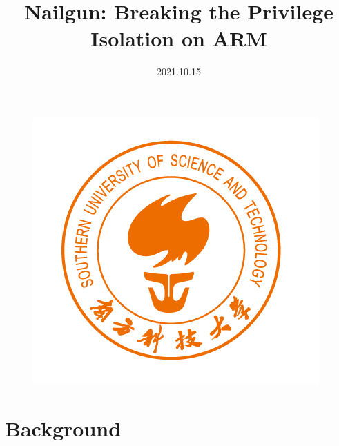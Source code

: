 \documentclass{beamer}
\title{Nailgun: Breaking the Privilege Isolation on ARM}
\date{2021.10.15}
\begin{document}
\kaishu
\begin{frame}
    \titlepage
    \begin{figure}[htbp]
        \begin{center}
            \includegraphics[scale = 0.16]{pic/LOGO.png}
        \end{center}
    \end{figure}
\end{frame}

\begin{frame}
    \tableofcontents[sectionstyle=show,subsectionstyle=show/shaded/hide,subsubsectionstyle=show/shaded/hide]
\end{frame}

\section{Background}
\end{document}
